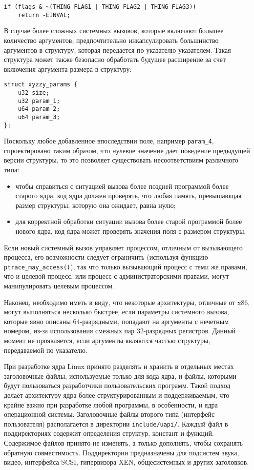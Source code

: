 \medskip
\begin{lstlisting}[style=cstyle]
if (flags & ~(THING_FLAG1 | THING_FLAG2 | THING_FLAG3))
	return -EINVAL;
\end{lstlisting}
\medskip

В случае более сложных системных вызовов, которые включают большее количество
аргументов, предпочтительно инкапсулировать большинство аргументов в структуру,
которая передается по указателю указателем. Такая структура может также
безопасно обработать будущее расширение за счет включения аргумента размера в
структуру:

\medskip
\begin{lstlisting}[style=cstyle]
struct xyzzy_params {
	u32 size;
	u32 param_1;
	u64 param_2;
	u64 param_3;
};
\end{lstlisting}
\medskip

Поскольку любое добавленное впоследствии поле, например \texttt{param\_4},
спроектировано таким образом, что нулевое значение дает поведение предыдущей
версии структуры, то это позволяет существовать несоответствиям различного типа:
\begin{itemize}
\item чтобы справиться с ситуацией вызова более поздней программой более старого
  ядра, код ядра должен проверять, что любая память, превышающая размер
  структуры, которую она ожидает, равна нулю;
\item для корректной обработки ситуации вызова более старой программой более
  нового ядра, код ядра может проверять значения поля с размером структуры.
\end{itemize}

Если новый системный вызов управляет процессом, отличным от вызывающего
процесса, его возможности следует ограничить (используя функцию
\texttt{ptrace\_may\_access()}), так что только вызывающий процесс с теми же
правами, что и целевой процесс, или процесс с администраторскими правами, могут
манипулировать целевым процессом.

Наконец, необходимо иметь в виду, что некоторые архитектуры, отличные от x86,
могут выполняться несколько быстрее, если параметры системного вызова, которые
явно описаны 64-разрядными, попадают на аргументы с нечетным номером, из-за
использования смежных пар 32-разрядных регистров. Данный момент не проявляется,
если аргументы являются частью структуры, передаваемой по указателю.

При разработке ядра Linux принято разделять и хранить в отдельных местах
заголовочные файлы, используемые только для кода ядра, и файлы, которыми будут
пользоваться разработчики пользовательских программ. Такой подход делает
архитектуру ядра более структурированным и поддерживаемым, что крайне важно при
разработке любой программы, в особенности, и ядра операционной системы.
Заголовочные файлы второго типа (интерфейс пользователя) располагается в
директории \texttt{include/uapi/}. Каждый файл в поддиректориях содержит
определения структур, констант и функций. Содержимое файлов принято не изменять,
а только дополнять, чтобы сохранять обратную совместимость. Поддиректории
предназначены для подсистем звука, видео, интерфейса SCSI, гипервизора XEN,
общесистемных и других заголовков.

